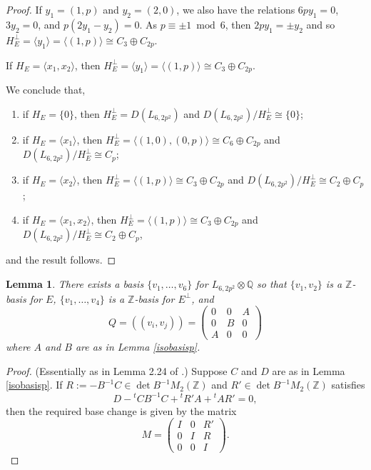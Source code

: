 \documentclass[11pt]{amsart}
\newtheorem{lem}[thm]{Lemma}
\newcommand{\ZZ}{\mathbb{Z}}
\newcommand{\QQ}{\mathbb{Q}}
\newcommand{\la}{\langle}
\newcommand{\ra}{\rangle}
\newcommand{\opn}{\operatorname}
\newcommand{\op}{\oplus}
\begin{document}
\begin{proof}
If $y_1 = (1,p)$ and $y_2 = (2,0)$, we also have the relations 
$6py_1 = 0$,
$3y_2 = 0$,
and $p(2y_1-y_2) = 0$. 
As $p \equiv \pm 1 \bmod{6}$, then 
$2py_1 = \pm y_2$  
and so $H_E^{\perp} = \la y_1 \ra = \la (1,p) \ra \cong C_3 \op C_{2p}$. 

If $H_E = \la x_1, x_2 \ra$, then $H_E^{\perp} = \la y_1 \ra = \la (1,p) \ra \cong C_3 \op C_{2p}$. 

We conclude that,
\begin{enumerate}
\item if $H_E = \{0 \}$, then $H_E^{\perp}  = D(L_{6,2p^2})$ and $D(L_{6,2p^2})/H_E^{\perp} \cong \{0\}$; 
\item if $H_E = \la x_1 \ra$, then $H_E^{\perp} = \la (1,0), (0,p) \ra \cong C_6 \op C_{2p}$ and $D(L_{6,2p^2})/H_E^{\perp} \cong  C_p$; 
\item if $H_E = \la x_2 \ra$, then $H_E^{\perp} = \la (1,p) \ra \cong C_3 \op C_{2p}$ and $ D(L_{6,2p^2})/H_E^{\perp} \cong C_2 \op C_{p}$; 
\item if  $H_E = \la x_1, x_2 \ra$, then $H_E^{\perp} = \la (1,p) \ra \cong C_3 \op C_{2p}$ and $D(L_{6,2p^2})/H_E^{\perp} \cong C_2 \op C_{p}$,
\end{enumerate}
and the result follows.
\end{proof}
\begin{lem}\label{Qbasis}
There exists a basis $\{v_1, \ldots, v_6\}$ for $L_{6,2p^2} \otimes \QQ$ so that $\{v_1, v_2\}$ is a $\ZZ$-basis for $E$, $\{v_1, \ldots, v_4\}$ is a $\ZZ$-basis for $E^{\perp}$, and 
\begin{equation*}
  Q = ((v_i, v_j)) =
  \begin{pmatrix} 
    0 & 0 & A \\ 
    0 & B & 0 \\ 
    A & 0 & 0 
  \end{pmatrix}
\end{equation*}
where $A$ and $B$ are as in Lemma \ref{isobasisp}.
\end{lem}
\begin{proof} 
(Essentially as in Lemma 2.24 of \cite{GHSK3}.) 
  Suppose $C$ and $D$ are as in Lemma \ref{isobasisp}.
If $R := -B^{-1} C \in \opn{det}B^{-1} M_2(\ZZ)$ and $R' \in \opn{det}B^{-1} M_2(\ZZ)$ satisfies
\begin{equation*}
  D - {}^tCB^{-1}C + {}^tR'A + {}^tAR' = 0,
\end{equation*}
then the required base change is given by the matrix
\begin{equation}\label{BaseChangeN}
  M
  =
  \begin{pmatrix} 
    I & 0 & R' \\ 
    0 & I & R \\ 
    0 & 0 & I 
  \end{pmatrix}.
\end{equation}
\end{proof}
\end{document}

